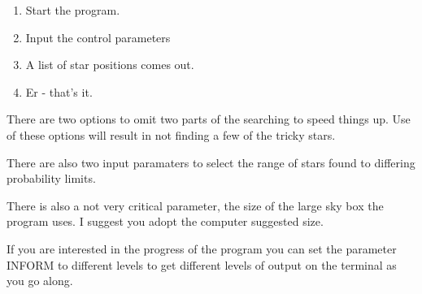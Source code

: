 \begin{small}
{{\begin{enumerate}
  \item Start the program.
  \item Input the control parameters
  \item A list of star positions comes out.
  \item Er - that's it.
\end{enumerate}
 
  There are two options to omit two parts of the searching to speed
  things up. Use of these options will result in not finding a few of
  the tricky stars.
 
  There are also two input paramaters to select the range of stars
  found to differing probability limits.
 
  There is also a not very critical parameter, the size of the large
  sky box the program uses. I suggest you adopt the computer suggested
  size.
 
  If you are interested in the progress of the program you can set
  the parameter INFORM to different levels to get different levels of
  output on the terminal as you go along.
 
}}
\end{small}
